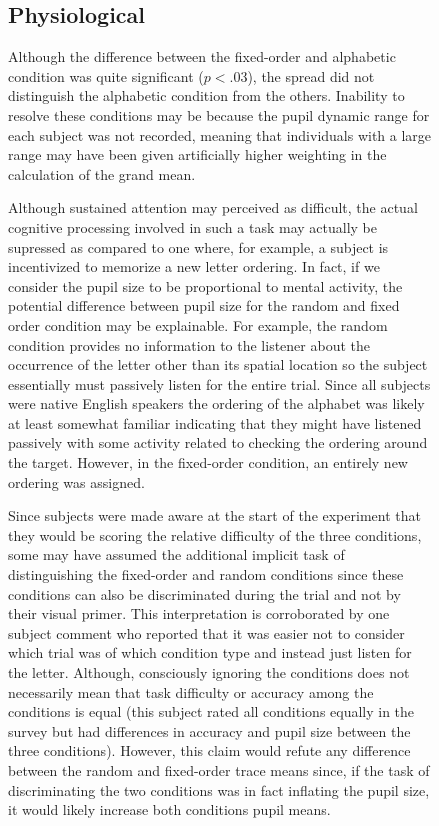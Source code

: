 \documentclass[10pt]{article}
\begin{document}
\begin{figure}
\subsection{Physiological}
Although the difference between the fixed-order and alphabetic
condition was quite significant ($p<.03$), the spread did not
distinguish the alphabetic condition from the others. Inability to resolve these conditions may be
because the
pupil dynamic range for each subject was not recorded, meaning that
individuals with a large range may have been given artificially higher
weighting in the calculation of the grand mean.

Although sustained attention may perceived as difficult, the
actual cognitive processing involved in such a task may
actually be supressed as compared to one where, for example, a
subject is incentivized to memorize a new letter ordering.  In
fact, if we consider the pupil size to be proportional to
mental activity, the potential difference between pupil size
for the random and fixed order condition may be explainable.
For example, the random condition provides no information to
the listener about the occurrence of the letter other than its
spatial location so the subject essentially must passively
listen for the entire trial.  Since all subjects were native
English speakers the ordering of the alphabet was likely at
least somewhat familiar indicating that they might have listened passively
with some activity related to checking the ordering around the
target.  However, in the fixed-order condition, an entirely new ordering
was assigned.  

Since subjects were made aware at the start of the experiment that
they would be scoring the relative difficulty of the three
conditions, some may have assumed the additional implicit task of
distinguishing the fixed-order and random conditions since these
conditions can also be discriminated during the trial and not by
their visual primer.  
This interpretation is corroborated by
one subject comment who reported that it was easier
not to consider which trial was of which condition type and
instead just listen for the letter.  Although, consciously
ignoring the conditions does not necessarily mean that task
difficulty or accuracy among the conditions is equal (this
subject rated all conditions equally in the survey but had
differences in accuracy and pupil size between the three
conditions).
However, this claim would refute any
difference between the random and fixed-order trace means since, if
the task of discriminating the two conditions was in fact inflating
the pupil size, it would likely increase both conditions pupil
means. 


\end{figure}
\end{document}
